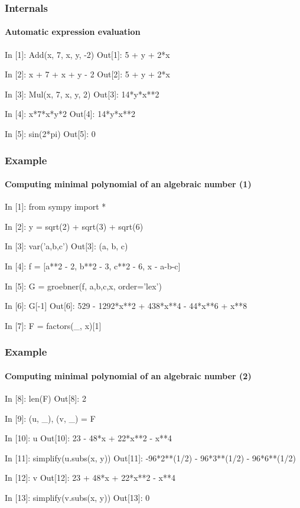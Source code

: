 \documentclass[handout]{beamer}
\begin{document}
\begin{frame}[fragile]
    \frametitle{Internals}
    \framesubtitle{Automatic expression evaluation}

    \begin{python}
In [1]: Add(x, 7, x, y, -2)
Out[1]: 5 + y + 2*x

In [2]: x + 7 + x + y - 2
Out[2]: 5 + y + 2*x

In [3]: Mul(x, 7, x, y, 2)
Out[3]: 14*y*x**2

In [4]: x*7*x*y*2
Out[4]: 14*y*x**2

In [5]: sin(2*pi)
Out[5]: 0
    \end{python}

\end{frame}

\begin{frame}[fragile]
    \frametitle{Example}
    \framesubtitle{Computing minimal polynomial of an algebraic number (1)}

    \begin{python}
In [1]: from sympy import *

In [2]: y = sqrt(2) + sqrt(3) + sqrt(6)

In [3]: var('a,b,c')
Out[3]: (a, b, c)

In [4]: f = [a**2 - 2, b**2 - 3, c**2 - 6, x - a-b-c]

In [5]: G = groebner(f, a,b,c,x, order='lex')

In [6]: G[-1]
Out[6]: 529 - 1292*x**2 + 438*x**4 - 44*x**6 + x**8

In [7]: F = factors(_, x)[1]
    \end{python}
\end{frame}

\begin{frame}[fragile]
    \frametitle{Example}
    \framesubtitle{Computing minimal polynomial of an algebraic number (2)}

    \begin{python}
In [8]: len(F)
Out[8]: 2

In [9]: (u, _), (v, _) = F

In [10]: u
Out[10]: 23 - 48*x + 22*x**2 - x**4

In [11]: simplify(u.subs(x, y))
Out[11]: -96*2**(1/2) - 96*3**(1/2) - 96*6**(1/2)

In [12]: v
Out[12]: 23 + 48*x + 22*x**2 - x**4

In [13]: simplify(v.subs(x, y))
Out[13]: 0
    \end{python}
\end{frame}
\end{document}
